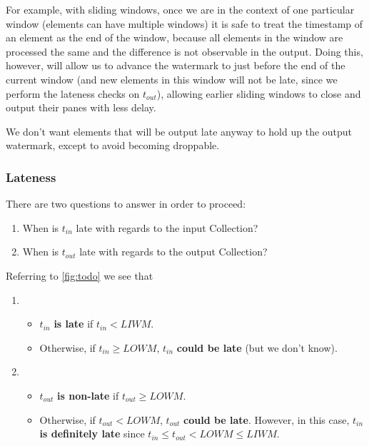 For example, with sliding windows, once we are in the context of one particular window (elements can have multiple windows) it is safe to treat the timestamp of an element as the end of the window, because all elements in the window are processed the same and the difference is not observable in the output.
Doing this, however, will allow us to advance the watermark to just before the end of the current window (and new elements in this window will not be late, since we perform the lateness checks on $t_{\mathit{out}}$), allowing earlier sliding windows to close and output their panes with less delay.



We don't want elements that will be output late anyway to hold up the output watermark, except to avoid becoming droppable.


\subsubsection{Lateness}

There are two questions to answer in order to proceed:
\begin{enumerate}
	\item When is $t_{\mathit{in}}$ late with regards to the input Collection?
	\item When is $t_{\mathit{out}}$ late with regards to the output Collection?
\end{enumerate}

Referring to \cref{fig:todo} we see that
\begin{enumerate}
	\item \begin{itemize}
	\item $t_{\mathit{in}}$ \textbf{is late} if $t_{\mathit{in}} < \mathit{LIWM}$.
	\item Otherwise, if $t_{\mathit{in}} \geq \mathit{LOWM}$, $t_{\mathit{in}}$ \textbf{could be late} (but we don't know).
	\end{itemize}
	\item \begin{itemize}
	\item $t_{\mathit{out}}$ \textbf{is non-late} if $t_{\mathit{out}} \geq \mathit{LOWM}$.
	\item Otherwise, if $t_{\mathit{out}} < \mathit{LOWM}$, $t_{\mathit{out}}$ \textbf{could be late}. However, in this case, $t_{\mathit{in}}$ \textbf{is definitely late} since $t_{\mathit{in}} \leq t_{\mathit{out}} < \mathit{LOWM} \leq \mathit{LIWM}$.
	\end{itemize}
\end{enumerate}


